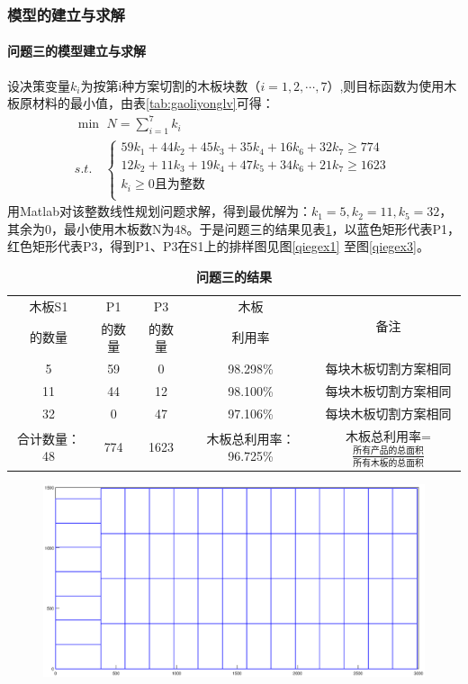 \documentclass[hyperref,UTF8]{article}
\begin{document}
{\subsubsection{模型的建立与求解}
\paragraph{问题三的模型建立与求解}
设决策变量$k_i$为按第i种方案切割的木板块数（$i=1,2,\cdots ,7$）,则目标函数为使用木板原材料的最小值，由表\ref{tab:gaoliyonglv}可得：
\begin{equation}\label{zuixiaozhi1}
  \begin{split}
&\min \,\, N=\sum_{i=1}^7 k_i\\
&s.t.\quad  \left\{\begin{array}{c}
59k_1+44k_2+45k_3+35k_4+16k_6+32k_7\geq774\quad \\
12k_2+11k_3+19k_4+47k_5+34k_6+21k_7\geq1623\quad \\
k_i\geq0\mbox{且为整数}\quad \\
\end{array}\right.
\end{split}
\end{equation}
用Matlab对该整数线性规划问题求解，得到最优解为：$k_1=5,k_2=11,k_5=32$，其余为0，最小使用木板数N为48。于是问题三的结果见表\ref{tab:quastion3}，以蓝色矩形代表P1，红色矩形代表P3，得到P1、P3在S1上的排样图见图\ref{qiegex1}
至图\ref{qiegex3}。
\begin{table}[htbp]
  \centering
  \caption{\textbf{问题三的结果}}
    \begin{tabular}{|c|c|c|c|c|}
    \hline
    木板S1 & P1& P3 & 木板 & \multicolumn{1}{c|}{\multirow{2}[0]{*}{备注}} \\
    的数量&   的数量&    的数量&     利用率      &\\\hline
    5 & 59 & 0 & 98.298\% & 每块木板切割方案相同 \\\hline
    11 & 44 & 12 & 98.100\% & 每块木板切割方案相同 \\\hline
    32 & 0 & 47 & 97.106\% & 每块木板切割方案相同 \\\hline
    合计数量： 48 & 774 & 1623 & 木板总利用率：96.725\% & 木板总利用率=$\frac{\mbox{所有产品的总面积}}{\mbox{所有木板的总面积}}$ \\\hline
    \end{tabular}%
  \label{tab:quastion3}%
\end{table}%
\begin{figure}[htbp]
  \centering
  \includegraphics[width=\textwidth]{picture/problem1}

\end{figure}}
\end{document}
